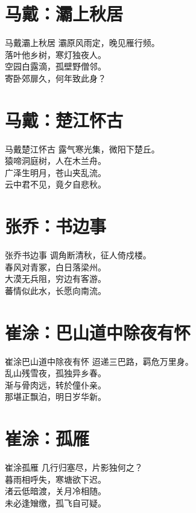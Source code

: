 \documentclass[12pt,oneside,a5paper]{book}
\begin{document}
\chapter{马戴：灞上秋居}
\begin{poemzh}{马戴}{灞上秋居}
灞原风雨定，晚见雁行频。\\
落叶他乡树，寒灯独夜人。\\
空园白露滴，孤壁野僧邻。\\
寄卧郊扉久，何年致此身？\\ 
\end{poemzh}

\chapter{马戴：楚江怀古}
\begin{poemzh}{马戴}{楚江怀古}
露气寒光集，微阳下楚丘。\\
猿啼洞庭树，人在木兰舟。\\
广泽生明月，苍山夹乱流。\\
云中君不见，竟夕自悲秋。\\ 
\end{poemzh}

\chapter{张乔：书边事}
\begin{poemzh}{张乔}{书边事}
调角断清秋，征人倚戍楼。\\
春风对青冢，白日落梁州。\\
大漠无兵阻，穷边有客游。\\
蕃情似此水，长愿向南流。\\ 
\end{poemzh}

\chapter{崔涂：巴山道中除夜有怀}
\begin{poemzh}{崔涂}{巴山道中除夜有怀}
迢递三巴路，羁危万里身。\\
乱山残雪夜，孤独异乡春。\\
渐与骨肉远，转於僮仆亲。\\
那堪正飘泊，明日岁华新。\\ 
\end{poemzh}

\chapter{崔涂：孤雁}
\begin{poemzh}{崔涂}{孤雁}
几行归塞尽，片影独何之？\\
暮雨相呼失，寒塘欲下迟。\\
渚云低暗渡，关月冷相随。\\
未必逢矰缴，孤飞自可疑。\\ 
\end{poemzh}
\end{document}
